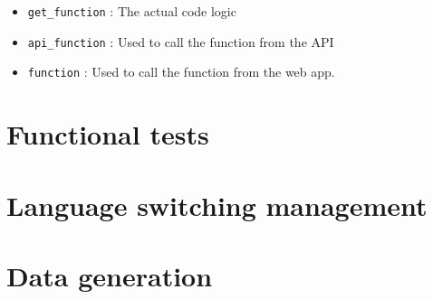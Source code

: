 \documentclass[a4paper, 11pt]{report}
\begin{document}
    \begin{itemize}
        \item \texttt{get\_function} : The actual code logic
        \item \texttt{api\_function} : Used to call the function from the API
        \item \texttt{function} : Used to call the function from the web app.
    \end{itemize}

    \section{Functional tests}

    \section{Language switching management}

    \section{Data generation}
\end{document}

